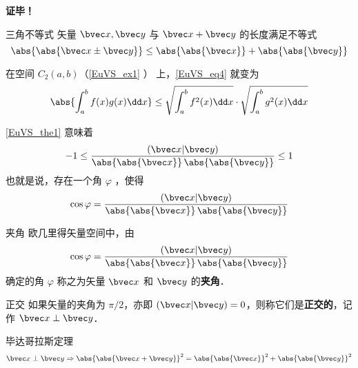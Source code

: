 \textbf{证毕！}
\begin{corollary}{三角不等式}
矢量 $\bvec x,\bvec y$ 与 $\bvec x+\bvec y$ 的长度满足不等式
\begin{equation}
\abs{\abs{\bvec x\pm\bvec y}}\leq\abs{\abs{\bvec x}}+\abs{\abs{\bvec y}}
\end{equation}

\end{corollary}
\begin{example}{}
在空间 $C_2(a,b)$（\autoref{EuVS_ex1} ） 上，\autoref{EuVS_eq4} 就变为
\begin{equation}
\abs{\int_a^b f(x)g(x)\dd x}\leq\sqrt{\int_a^b f^2(x)\dd x}\cdot\sqrt{\int_a^b g^2(x)\dd x}
\end{equation}
\end{example}
\autoref{EuVS_the1} 意味着
\begin{equation}
-1\leq\frac{(\bvec x|\bvec y)}{\abs{\abs{\bvec x}}\,\abs{\abs{\bvec y}}}\leq1
\end{equation}
也就是说，存在一个角 $\varphi$ ，使得
\begin{equation}
\cos\varphi=\frac{(\bvec x|\bvec y)}{\abs{\abs{\bvec x}}\,\abs{\abs{\bvec y}}}
\end{equation}
\begin{definition}{夹角}
欧几里得矢量空间中，由
\begin{equation}
\cos\varphi=\frac{(\bvec x|\bvec y)}{\abs{\abs{\bvec x}}\,\abs{\abs{\bvec y}}}
\end{equation}
确定的角 $\varphi$ 称之为矢量 $\bvec x$ 和 $\bvec y$ 的\textbf{夹角}． 
\end{definition}
\begin{definition}{正交}
如果矢量的夹角为 $\pi/2$，亦即 $(\bvec x|\bvec y)=0$，则称它们是\textbf{正交的}，记作 $\bvec x\perp\bvec y$．
\end{definition}
\begin{theorem}{毕达哥拉斯定理}
\begin{equation}
\bvec x\perp\bvec y\Rightarrow\abs{\abs{\bvec x+\bvec y}}^2=\abs{\abs{\bvec x}}^2+\abs{\abs{\bvec y}}^2
\end{equation}
\end{theorem}
